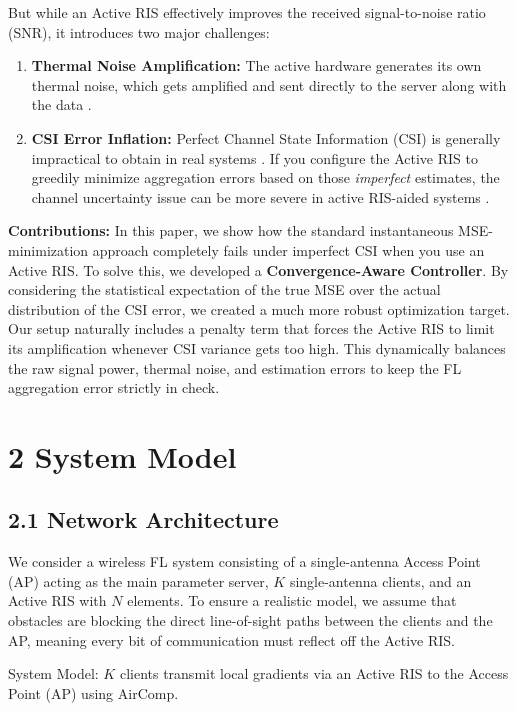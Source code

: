 \documentclass[10pt,twocolumn]{article}
\begin{document}
But while an Active RIS effectively improves the received signal-to-noise ratio (SNR), it introduces two major challenges:
\begin{enumerate}
\item 

\textbf{Thermal Noise Amplification:} The active hardware generates its own thermal noise, which gets amplified and sent directly to the server along with the data  \parencite{zijian_zhang_9030ef0d}.\item 

\textbf{CSI Error Inflation:} Perfect Channel State Information (CSI) is generally impractical to obtain in real systems  \parencite{hao_zhou_d3ae4bac}. If you configure the Active RIS to greedily minimize aggregation errors based on those \textit{imperfect} estimates, the channel uncertainty issue can be more severe in active RIS-aided systems  \parencite{jin_ho_yang_7e8f89d2}.
\end{enumerate}

\textbf{Contributions:} In this paper, we show how the standard instantaneous MSE-minimization approach completely fails under imperfect CSI when you use an Active RIS. To solve this, we developed a \textbf{Convergence-Aware Controller}. By considering the statistical expectation of the true MSE over the actual distribution of the CSI error, we created a much more robust optimization target. Our setup naturally includes a penalty term that forces the Active RIS to limit its amplification whenever CSI variance gets too high. This dynamically balances the raw signal power, thermal noise, and estimation errors to keep the FL aggregation error strictly in check.
\section{2	System Model}
\subsection{2.1	Network Architecture}

We consider a wireless FL system consisting of a single-antenna Access Point (AP) acting as the main parameter server, $K$ single-antenna clients, and an Active RIS with $N$ elements. To ensure a realistic model, we assume that obstacles are blocking the direct line-of-sight paths between the clients and the AP, meaning every bit of communication must reflect off the Active RIS.

System Model: $K$ clients transmit local gradients via an Active RIS to the Access Point (AP) using AirComp.
\end{document}
